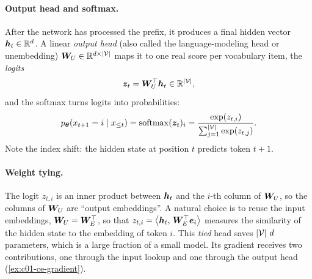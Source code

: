 \paragraph{Output head and softmax.} After the network has processed the prefix, it
produces a final hidden vector $\bm{h}_t \in \mathbb{R}^{d}$. A linear \emph{output head} (also called
the language-modeling head or unembedding) $\bm{W}_U \in \mathbb{R}^{d \times \left\lvert \mathcal{V}\right\rvert}$
maps it to one real score per vocabulary item, the \emph{logits}
\begin{equation}\label{eq:c01-logits}
  \bm{z}_t = \bm{W}_U^{\top} \bm{h}_t \in \mathbb{R}^{\left\lvert \mathcal{V}\right\rvert},
\end{equation}
and the softmax turns logits into probabilities:
\begin{equation}\label{eq:c01-softmax}
  p_{\bm{\theta}}(x_{t+1} = i \mid x_{\le t})
  = \operatorname{softmax}(\bm{z}_t)_i
  = \frac{\exp(z_{t,i})}{\sum_{j=1}^{\left\lvert \mathcal{V}\right\rvert} \exp(z_{t,j})}.
\end{equation}
Note the index shift: the hidden state at position $t$ predicts token $t+1$.

\paragraph{Weight tying.} The logit $z_{t,i}$ is an inner product between $\bm{h}_t$ and the
$i$-th column of $\bm{W}_U$, so the columns of $\bm{W}_U$ are ``output embeddings''. A natural
choice is to reuse the input embeddings, $\bm{W}_U = \bm{W}_E^{\top}$, so that
$z_{t,i} = \left\langle \bm{h}_t,\, \bm{W}_E^{\top}\bm{e}_i\right\rangle$ measures the similarity of the hidden state to the
embedding of token $i$. This \emph{tied} head \citep{c01-press2017tying} saves
$\left\lvert \mathcal{V}\right\rvert\,d$ parameters, which is a large fraction of a small model. Its gradient
receives two contributions, one through the input lookup and one through the output head
(\cref{ex:c01-ce-gradient}).

